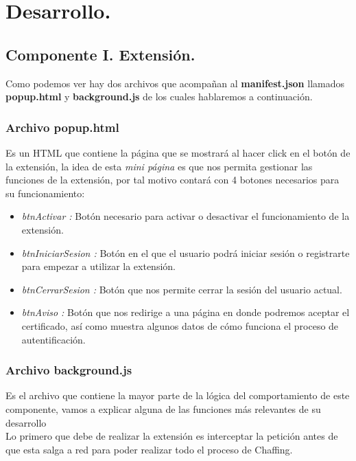 \documentclass[12pt, a4paper, titlepage]{report}
\begin{document}
    \chapter{\textcolor{azulescom}{Desarrollo}.}
        
        \section{Componente I. Extensión.}

            
            Como podemos ver hay dos archivos que acompañan al \textbf{manifest.json} llamados \textbf{popup.html} y \textbf{background.js} de los cuales hablaremos a continuación.\\
            \subsection{Archivo popup.html}
            Es un HTML que contiene la página que se mostrará al hacer click en el botón de la extensión, la idea de esta \textit{mini página} es que nos permita gestionar las funciones de la extensión, por tal motivo contará con 4 botones necesarios para su funcionamiento:
            \begin{itemize}
                \item \textit{btnActivar :} Botón necesario para activar o desactivar el funcionamiento de la extensión.
                \item \textit{btnIniciarSesion :} Botón en el que el usuario podrá iniciar sesión o registrarte para empezar a utilizar la extensión.
                \item \textit{btnCerrarSesion :} Botón que nos permite cerrar la sesión del usuario actual.
                \item \textit{btnAviso :} Botón que nos redirige a una página en donde podremos aceptar el certificado, así como muestra algunos datos de cómo funciona el proceso de autentificación.
            \end{itemize}
            \subsection{Archivo background.js}
            Es el archivo que contiene la mayor parte de la lógica del comportamiento de este componente, vamos a explicar alguna de las funciones más relevantes de su desarrollo\\
            Lo primero que debe de realizar la extensión es interceptar la petición antes de que esta salga a red para poder realizar todo el proceso de Chaffing.
            
\end{document}
